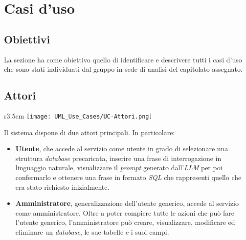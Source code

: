 \section{Casi d'uso}



\subsection{Obiettivi}
La sezione ha come obiettivo quello di identificare e descrivere tutti i casi d'uso che sono stati individuati dal gruppo in sede di analisi del capitolato assegnato.

\subsection{Attori}
\begin{wrapfigure}{r}{3.5cm}
	\texttt{[image: UML\_Use\_Cases/UC-Attori.png]}
\end{wrapfigure}
Il sistema dispone di due attori principali. In particolare:
\begin{itemize}
	\item \textbf{Utente}, che accede al servizio come utente in grado di selezionare una struttura \textit{database} precaricata, inserire una frase di interrogazione in linguaggio naturale, visualizzare il \textit{prompt} generato dall'\textit{LLM} per poi confermarlo e ottenere una frase in formato \textit{SQL} che rappresenti quello che era stato richiesto inizialmente.
	\item \textbf{Amministratore}, generalizzazione dell'utente generico, accede al servizio come amministratore. Oltre a poter compiere tutte le azioni che può fare l'utente generico, l'amministratore può creare, visualizzare, modificare ed eliminare un \textit{database}, le sue tabelle e i suoi campi.
\end{itemize}

